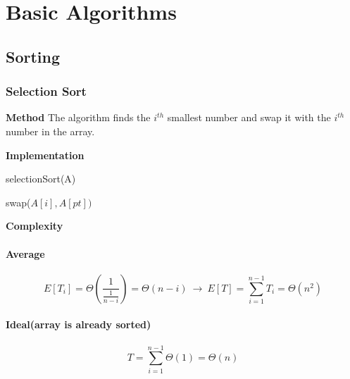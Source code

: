 \documentclass[11pt]{article}
\begin{document}
\section{Basic Algorithms}
\subsection{Sorting}
\subsubsection{Selection Sort}
\noindent \textbf{Method}
The algorithm finds the $i^{th}$ smallest number and swap it with the $i^{th}$ number in the array.
\par \noindent \textbf{Implementation}
\begin{algorithm}
    \caption{selectionSort(A)}
    \label{selSort}
    \begin{algorithmic}
         \ENDIF
        \STATE swap($A[i], A[pt])$
        \ENDFOR \ENDFOR
    \end{algorithmic}
\end{algorithm} \par \noindent
\textbf{Complexity}
\paragraph{Average}
\begin{equation}
    E[T_i] = \Theta(\frac{1}{\frac{1}{n-i}}) = \Theta(n-i)~\rightarrow~E[T] =  \sum_{i=1}^{n-1}T_i = \Theta(n^2)
\end{equation}
\paragraph{Ideal(array is already sorted)}
\begin{equation}
    T = \sum_{i=1}^{n-1}\Theta(1)= \Theta(n)
\end{equation}
\end{document}
